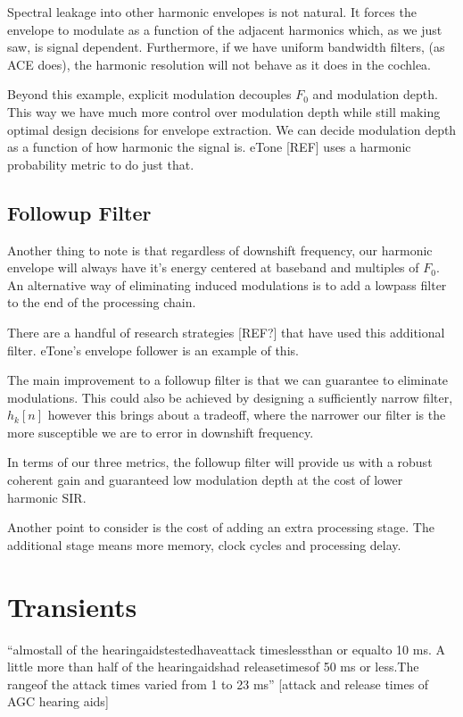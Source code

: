 \documentclass [11pt, proquest] {uwthesis}[2015/03/03]
\begin{document}
Spectral leakage into other harmonic envelopes is not natural.  It forces the envelope to modulate as a function of the adjacent harmonics which, as we just saw, is signal dependent.  Furthermore, if we have uniform bandwidth filters, (as ACE does), the harmonic resolution will not behave as it does in the cochlea.

Beyond this example, explicit modulation decouples $F_0$ and modulation depth.  This way we have much more control over modulation depth while still making optimal design decisions for envelope extraction.  We can decide modulation depth as a function of how harmonic the signal is.  eTone [REF] uses a harmonic probability metric to do just that.

\subsection{Followup Filter}

Another thing to note is that regardless of downshift frequency, our harmonic envelope will always have it's energy centered at baseband and multiples of $F_0$.  An alternative way of eliminating induced modulations is to add a lowpass filter to the end of the processing chain.

There are a handful of research strategies [REF?] that have used this additional filter.  eTone's envelope follower is an example of this.

The main improvement to a followup filter is that we can guarantee to eliminate modulations.  This could also be achieved by designing a sufficiently narrow filter, $h_k[n]$ however this brings about a tradeoff, where the narrower our filter is the more susceptible we are to error in downshift frequency.

In terms of our three metrics, the followup filter will provide us with a robust coherent gain and guaranteed low modulation depth at the cost of lower harmonic SIR.

Another point to consider is the cost of adding an extra processing stage.  The additional stage means more memory, clock cycles and processing delay.


\section{Transients}

``almostall of the hearingaidstestedhaveattack timeslessthan or equalto 10 ms. A little more than half of the hearingaidshad releasetimesof 50 ms or less.The rangeof the attack times varied from 1 to 23 ms'' [attack and release times of AGC hearing aids]
\end{document}
